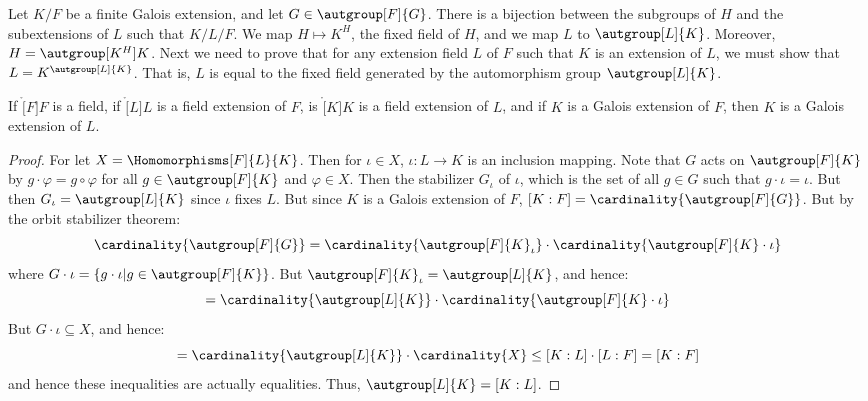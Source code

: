 \documentclass{article}                                                        %
\begin{document}
        Let $K/F$ be a finite Galois extension, and let $G\in\autgroup[F]{G}$.
        There is a bijection between the subgroups of $H$ and the subextensions
        of $L$ such that $K/L/F$. We map $H\mapsto{K}^{H}$, the fixed field
        of $H$, and we map $L$ to $\autgroup[L]{K}$. Moreover,
        $H=\autgroup[K^{H}]{K}$. Next we need to prove that for any extension
        field $L$ of $F$ such that $K$ is an extension of $L$, we must show
        that $L=K^{\autgroup[L]{K}}$. That is, $L$ is equal to the fixed field
        generated by the automorphism group $\autgroup[L]{K}$.
        \begin{theorem}
            If $\ring[F]{F}$ is a field, if $\ring[L]{L}$ is a field
            extension of $F$, is $\ring[K]{K}$ is a field extension of $L$,
            and if $K$ is a Galois extension of $F$, then $K$ is a Galois
            extension of $L$.
        \end{theorem}
        \begin{proof}
            For let $X=\Homomorphisms[F]{L}{K}$. Then for $\iota\in{X}$,
            $\iota:L\rightarrow{K}$ is an inclusion mapping. Note that
            $G$ acts on $\autgroup[F]{K}$ by $g\cdot\varphi=g\circ\varphi$
            for all $g\in\autgroup[F]{K}$ and $\varphi\in{X}$. Then the
            stabilizer $G_{\iota}$ of $\iota$, which is the set of all
            $g\in{G}$ such that $g\cdot\iota=\iota$. But then
            $G_{\iota}=\autgroup[L]{K}$ since $\iota$ fixes $L$. But since $K$
            is a Galois extension of $F$,
            $[K:F]=\cardinality{\autgroup[F]{G}}$. But by the orbit stabilizer
            theorem:
            \begin{equation}
                \cardinality{\autgroup[F]{G}}
                =\cardinality{\autgroup[F]{K}_{\iota}}\cdot
                    \cardinality{\autgroup[F]{K}\cdot\iota}
            \end{equation}
            where $G\cdot\iota=\{g\cdot\iota|g\in\autgroup[F]{K}\}$. But
            $\autgroup[F]{K}_{\iota}=\autgroup[L]{K}$, and hence:
            \begin{equation}
                [K:F]=\cardinality{\autgroup[L]{K}}\cdot
                    \cardinality{\autgroup[F]{K}\cdot\iota}
            \end{equation}
            But $G\cdot\iota\subseteq{X}$, and hence:
            \begin{equation}
                [K:F]=\cardinality{\autgroup[L]{K}}\cdot\cardinality{X}
                \leq[K:L]\cdot[L:F]=[K:F]
            \end{equation}
            and hence these inequalities are actually equalities. Thus,
            $\autgroup[L]{K}=[K:L]$.
        \end{proof}
\end{document}
